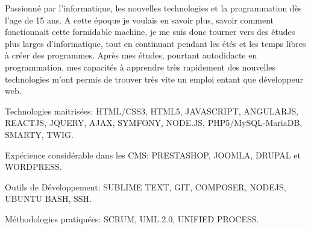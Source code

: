 {\textcolor{awesome}{\color{graytext}}  {Passionné par l'informatique, les nouvelles technologies et la programmation dès l'age de 15 ans. A cette époque je voulais en savoir plus, savoir comment fonctionnait cette formidable machine, je me suis donc tourner vers des études plus larges d'informatique, tout en continuant pendant les étés et les temps libres à créer des programmes. Après mes études, pourtant autodidacte en programmation, mes capacités à apprendre très rapidement des nouvelles technologies m'ont permis de trouver très vite un emploi entant que développeur web.}}

\begin{cventries}
  \cventry
    {}
    {}
    {}
    {}
    {
      \begin{cvitems}
        \item {Technologies maitrisées: HTML/CSS3, HTML5, JAVASCRIPT, ANGULARJS, REACTJS, JQUERY, AJAX, SYMFONY, NODE.JS, PHP5/MySQL-MariaDB, SMARTY, TWIG.}
        \item {Expérience considérable dans les CMS: PRESTASHOP, JOOMLA, DRUPAL et WORDPRESS.}
        \item {Outils de Développement: SUBLIME TEXT, GIT, COMPOSER, NODEJS, UBUNTU BASH, SSH.}
        \item {Méthodologie​s pratiquées: SCRUM, UML 2.0, UNIFIED PROCESS.}
      \end{cvitems}
    }
\end{cventries}